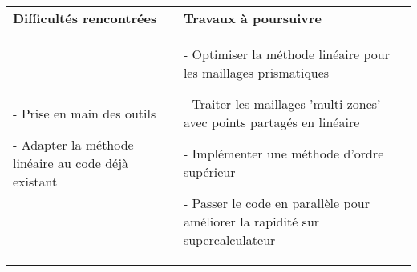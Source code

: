 \begin{table}[ht]
\begin{tabular}{|p{6.5cm}|p{8.5cm}|}
\begin{minipage}[t]{8.5cm}
\end{minipage} \\ 
\hline
\textbf{Difficultés rencontrées} & \textbf{Travaux à poursuivre} \\ 
\hline
\begin{minipage}[t]{6.5cm}
- Prise en main des outils

- Adapter la méthode linéaire au code déjà existant
\end{minipage} & 
\begin{minipage}[t]{8.5cm}
- Optimiser la méthode linéaire pour les maillages prismatiques

- Traiter les maillages 'multi-zones' avec points partagés en linéaire

- Implémenter une méthode d'ordre supérieur

- Passer le code en parallèle pour améliorer la rapidité sur supercalculateur
\end{minipage} \\ 
\hline
\end{tabular}
\end{table}  
\newpage
